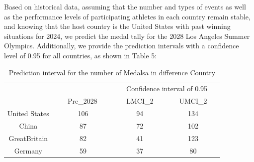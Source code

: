 \documentclass{mcmthesis}
\begin{document}
Based on historical data, assuming that the number and types of events as well as the performance levels of participating athletes in each country remain stable, and knowing that the host country is the United States with past winning situations for 2024, we predict the medal tally for the 2028 Los Angeles Summer Olympics. Additionally, we provide the prediction intervals with a confidence level of 0.95 for all countries, as shown in Table 5:

\begin{table}
\centering
\caption{Prediction interval for the number of Medalsa in difference Country}
\begin{tabular}{|c|ccc|} 
\hhline{|----|}
\rowcolor[rgb]{1,0.482,0} \multicolumn{1}{|c}{{\cellcolor[rgb]{1,0.482,0}}}                                      & {\cellcolor[rgb]{1,0.482,0}}                                    & \multicolumn{2}{c|}{~ ~Confidence interval of 0.95~ ~}                             \\
\rowcolor[rgb]{1,0.482,0} \multicolumn{1}{|c}{\multirow{-2}{*}{{\cellcolor[rgb]{1,0.482,0}}~ ~ ~ Country~ ~ ~~}} & \multirow{-2}{*}{{\cellcolor[rgb]{1,0.482,0}}~ ~ Pre\_2028~ ~~} & {\cellcolor[rgb]{1,0.824,0.635}}LMCI\_2 & {\cellcolor[rgb]{1,0.824,0.635}}UMCI\_2  \\ 
\hline
{\cellcolor[rgb]{0.992,0.737,0.529}}United States                                                                & 106                                                             & 94                                      & 134                                      \\ 
\hline
\rowcolor[rgb]{1,0.824,0.635} {\cellcolor[rgb]{0.992,0.737,0.529}}China                                          & 87                                                              & 72                                      & 102                                      \\ 
\hline
{\cellcolor[rgb]{0.992,0.737,0.529}}GreatBritain                                                                 & 82                                                              & 41                                      & 123                                      \\ 
\hline
\rowcolor[rgb]{1,0.824,0.635} {\cellcolor[rgb]{0.992,0.737,0.529}}Germany                                        & 59                                                              & 37                                      & 80                                       \\ 

\end{tabular}
\end{table}
\end{document}
